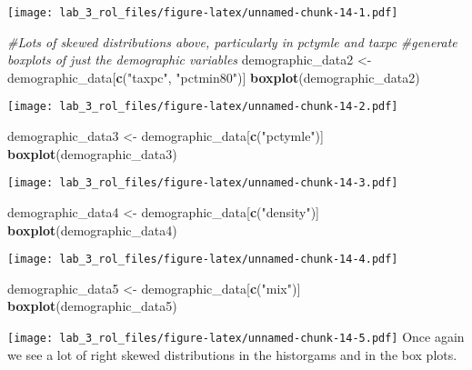 \documentclass[
]{article}
\newenvironment{Shaded}{\begin{snugshade}}{\end{snugshade}}
\newcommand{\CommentTok}[1]{\textcolor[rgb]{0.56,0.35,0.01}{\textit{#1}}}
\newcommand{\KeywordTok}[1]{\textcolor[rgb]{0.13,0.29,0.53}{\textbf{#1}}}
\newcommand{\NormalTok}[1]{#1}
\newcommand{\StringTok}[1]{\textcolor[rgb]{0.31,0.60,0.02}{#1}}
\begin{document}
\texttt{[image: lab\_3\_rol\_files/figure-latex/unnamed-chunk-14-1.pdf]}

\begin{Shaded}
\begin{Highlighting}[]
\CommentTok{#Lots of skewed distributions above, particularly in pctymle and taxpc}
\CommentTok{#generate boxplots of just the demographic variables}
\NormalTok{demographic_data2 <-}\StringTok{ }\NormalTok{demographic_data[}\KeywordTok{c}\NormalTok{(}\StringTok{"taxpc"}\NormalTok{, }\StringTok{"pctmin80"}\NormalTok{)]}
\KeywordTok{boxplot}\NormalTok{(demographic_data2)}
\end{Highlighting}
\end{Shaded}

\texttt{[image: lab\_3\_rol\_files/figure-latex/unnamed-chunk-14-2.pdf]}

\begin{Shaded}
\begin{Highlighting}[]
\NormalTok{demographic_data3 <-}\StringTok{ }\NormalTok{demographic_data[}\KeywordTok{c}\NormalTok{(}\StringTok{"pctymle"}\NormalTok{)]}
\KeywordTok{boxplot}\NormalTok{(demographic_data3)}
\end{Highlighting}
\end{Shaded}

\texttt{[image: lab\_3\_rol\_files/figure-latex/unnamed-chunk-14-3.pdf]}

\begin{Shaded}
\begin{Highlighting}[]
\NormalTok{demographic_data4 <-}\StringTok{ }\NormalTok{demographic_data[}\KeywordTok{c}\NormalTok{(}\StringTok{"density"}\NormalTok{)]}
\KeywordTok{boxplot}\NormalTok{(demographic_data4)}
\end{Highlighting}
\end{Shaded}

\texttt{[image: lab\_3\_rol\_files/figure-latex/unnamed-chunk-14-4.pdf]}

\begin{Shaded}
\begin{Highlighting}[]
\NormalTok{demographic_data5 <-}\StringTok{ }\NormalTok{demographic_data[}\KeywordTok{c}\NormalTok{(}\StringTok{"mix"}\NormalTok{)]}
\KeywordTok{boxplot}\NormalTok{(demographic_data5)}
\end{Highlighting}
\end{Shaded}

\texttt{[image: lab\_3\_rol\_files/figure-latex/unnamed-chunk-14-5.pdf]}
Once again we see a lot of right skewed distributions in the historgams
and in the box plots.\\
\end{document}

